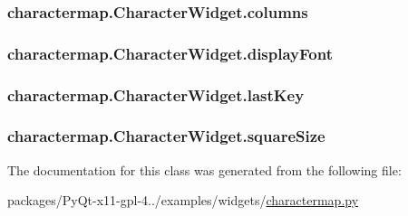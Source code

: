 \subsubsection[{columns}]{\setlength{\rightskip}{0pt plus 5cm}charactermap.\+Character\+Widget.\+columns}\label{classcharactermap_1_1CharacterWidget_a3bd55dc45562d284cabc9875a14abe4f}
\hypertarget{classcharactermap_1_1CharacterWidget_a8d517bbbda9bd370b101f32f4dfd5226}{}
\subsubsection[{display\+Font}]{\setlength{\rightskip}{0pt plus 5cm}charactermap.\+Character\+Widget.\+display\+Font}\label{classcharactermap_1_1CharacterWidget_a8d517bbbda9bd370b101f32f4dfd5226}
\hypertarget{classcharactermap_1_1CharacterWidget_a64bedfcff08bf95cd1f8ca2a1dfca75f}{}
\subsubsection[{last\+Key}]{\setlength{\rightskip}{0pt plus 5cm}charactermap.\+Character\+Widget.\+last\+Key}\label{classcharactermap_1_1CharacterWidget_a64bedfcff08bf95cd1f8ca2a1dfca75f}
\hypertarget{classcharactermap_1_1CharacterWidget_a657760bde9d33aac71f3da69759e2f8f}{}
\subsubsection[{square\+Size}]{\setlength{\rightskip}{0pt plus 5cm}charactermap.\+Character\+Widget.\+square\+Size}\label{classcharactermap_1_1CharacterWidget_a657760bde9d33aac71f3da69759e2f8f}


The documentation for this class was generated from the following file\+:\begin{DoxyCompactItemize}
\item 
packages/\+Py\+Qt-\/x11-\/gpl-\/4../examples/widgets/\hyperlink{charactermap_8py}{charactermap.\+py}\end{DoxyCompactItemize}
